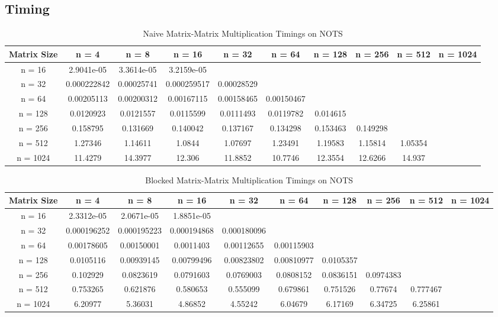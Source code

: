 \documentclass{article}
\begin{document}
\subsection{Timing}
\begin{table}[ht!]
    \caption{Naive Matrix-Matrix Multiplication Timings on NOTS}
    \centering
    \begin{tabular}{|c|c|c|c|c|c|c|c|c|c|}
        \hline
        Matrix Size & n = 4 & n = 8 & n = 16 & n = 32 & n = 64 & n = 128 & n = 256 & n = 512 & n = 1024 \\
        \hline
        n = 16 & 2.9041e-05 & 3.3614e-05 & 3.2159e-05 \\
        \hline
        n = 32 & 0.000222842 & 0.00025741 & 0.000259517 & 0.00028529 \\
        \hline
        n = 64 & 0.00205113 & 0.00200312 & 0.00167115 & 0.00158465 & 0.00150467 \\
        \hline
        n = 128 & 0.0120923 & 0.0121557 & 0.0115599 & 0.0111493 & 0.0119782 & 0.014615 \\
        \hline
        n = 256 & 0.158795 & 0.131669 & 0.140042 & 0.137167 & 0.134298 & 0.153463 & 0.149298 \\
        \hline
        n = 512 & 1.27346 & 1.14611 & 1.0844 & 1.07697 & 1.23491 & 1.19583 & 1.15814 & 1.05354 \\
        \hline 
        n = 1024 & 11.4279 & 14.3977 & 12.306 & 11.8852 & 10.7746 & 12.3554 & 12.6266 & 14.937 \\
        \hline
    \end{tabular}
\end{table}

\begin{table}[ht!]
    \caption{Blocked Matrix-Matrix Multiplication Timings on NOTS}
    \centering
    \begin{tabular}{|c|c|c|c|c|c|c|c|c|c|}
        \hline
        Matrix Size & n = 4 & n = 8 & n = 16 & n = 32 & n = 64 & n = 128 & n = 256 & n = 512 & n = 1024 \\
        \hline
        n = 16 & 2.3312e-05 & 2.0671e-05 & 1.8851e-05 \\
        \hline
        n = 32 & 0.000196252 & 0.000195223 & 0.000194868 & 0.000180096 \\
        \hline
        n = 64 & 0.00178605 & 0.00150001 & 0.0011403 & 0.00112655 & 0.00115903 \\
        \hline
        n = 128 & 0.0105116 & 0.00939145 & 0.00799496 & 0.00823802 & 0.00810977 & 0.0105357 \\
        \hline
        n = 256 & 0.102929 & 0.0823619 & 0.0791603 & 0.0769003 & 0.0808152 & 0.0836151 & 0.0974383 \\
        \hline
        n = 512 & 0.753265 & 0.621876 & 0.580653 & 0.555099 & 0.679861 & 0.751526 & 0.77674 & 0.777467 \\
        \hline 
        n = 1024 & 6.20977 & 5.36031 & 4.86852 & 4.55242 & 6.04679 & 6.17169 & 6.34725 & 6.25861 \\
        \hline
    \end{tabular}
\end{table}
\end{document}
